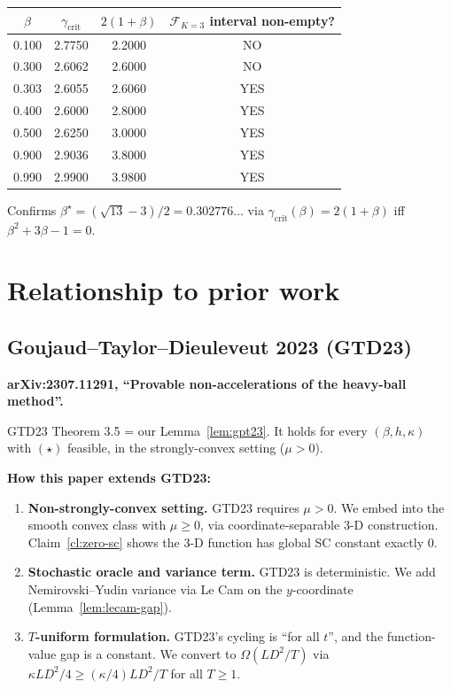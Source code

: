 \documentclass[11pt]{article}
\theoremstyle{definition}
\theoremstyle{remark}
\begin{document}
\begin{center}
\small
\begin{tabular}{cccc}
\toprule
$\beta$ & $\gamma_{\mathrm{crit}}$ & $2(1+\beta)$ & $\mathcal{F}_{K=3}$ interval non-empty? \\
\midrule
0.100 & 2.7750 & 2.2000 & NO  \\
0.300 & 2.6062 & 2.6000 & NO  \\
0.303 & 2.6055 & 2.6060 & YES \\
0.400 & 2.6000 & 2.8000 & YES \\
0.500 & 2.6250 & 3.0000 & YES \\
0.900 & 2.9036 & 3.8000 & YES \\
0.990 & 2.9900 & 3.9800 & YES \\
\bottomrule
\end{tabular}
\end{center}

Confirms $\beta^\star = (\sqrt{13} - 3)/2 = 0.302776\ldots$ via $\gamma_{\mathrm{crit}}(\beta) = 2(1+\beta)$ iff $\beta^2 + 3\beta - 1 = 0$.

\section{Relationship to prior work}
\label{sec:prior-work}

\subsection{Goujaud--Taylor--Dieuleveut 2023 (GTD23)}

\textbf{arXiv:2307.11291, ``Provable non-accelerations of the heavy-ball method''.}

GTD23 Theorem 3.5 = our Lemma~\ref{lem:gpt23}. It holds for every $(\beta, h, \kappa)$ with $(\star)$ feasible, in the strongly-convex setting ($\mu > 0$).

\textbf{How this paper extends GTD23:}
\begin{enumerate}
\item \textbf{Non-strongly-convex setting.} GTD23 requires $\mu > 0$. We embed into the smooth convex class with $\mu \geq 0$, via coordinate-separable 3-D construction. Claim~\ref{cl:zero-sc} shows the 3-D function has global SC constant exactly $0$.
\item \textbf{Stochastic oracle and variance term.} GTD23 is deterministic. We add Nemirovski--Yudin variance via Le Cam on the $y$-coordinate (Lemma~\ref{lem:lecam-gap}).
\item \textbf{$T$-uniform formulation.} GTD23's cycling is ``for all $t$'', and the function-value gap is a constant. We convert to $\Omega(LD^2/T)$ via $\kappa LD^2/4 \geq (\kappa/4)LD^2/T$ for all $T \geq 1$.
\end{enumerate}
\end{document}
